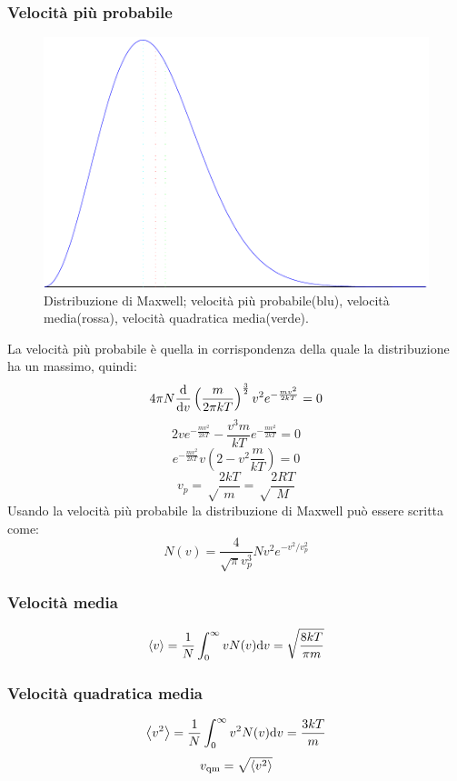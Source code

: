 \subsubsection{Velocità più probabile}
\begin{figure}[htbp]
   \centering
   \includegraphics[scale=0.5]{immagini/fisica1/maxwell}
   \caption{Distribuzione di Maxwell; velocità più probabile(blu), velocità media(rossa), velocità quadratica media(verde).}
\end{figure}
La velocità più probabile è quella in corrispondenza della quale la distribuzione ha un massimo, quindi:
\[4\pi N\frac{\mathrm{d}}{\mathrm{d} v}\left(\frac{m}{2\pi kT}\right)^{\frac{3}{2}}v^2e^{-\frac{mv^2}{2kT}}=0\]
\[2ve^{-\frac{mv^2}{2kT}}-\frac{v^3m}{kT}e^{-\frac{mv^2}{2kT}}=0\]
\[e^{-\frac{mv^2}{2kT}}v\left(2-v^2\frac{m}{kT}\right)=0\]
\begin{equation}
   v_p=\sqrt\frac{2kT}{m}=\sqrt\frac{2RT}{M}
\end{equation}
Usando la velocità più probabile la distribuzione di Maxwell può essere scritta come:
\begin{equation}
   N(v) = \frac{4}{\sqrt{\pi}v_p^3}N v^2 e^{-v^2/v_p^2}
\end{equation}
\subsubsection{Velocità media}
\begin{equation}
   \left<v\right>=\frac{1}{N}\int_0^\infty vN(v)\mathrm{d} v=\sqrt\frac{8kT}{\pi m}
\end{equation}

\subsubsection{Velocità quadratica media}
\begin{equation}
   \left<v^2\right>=\frac{1}{N}\int_0^\infty v^2N(v)\mathrm{d} v=\frac{3kT}{m}
\end{equation}
\[v_\text{qm}=\sqrt{\left<v^2\right>}\]



